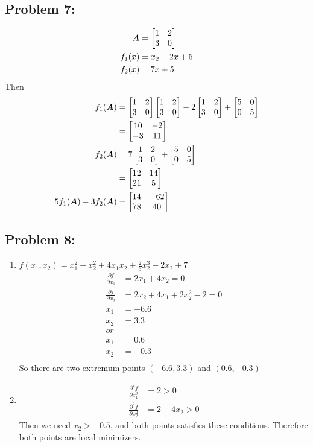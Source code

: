 \documentclass{article}
\begin{document}
\hypertarget{}{}
\subsection*{{Problem 7: }}
\label{}
\begin{align*}
\boldsymbol{A}&=\begin{bmatrix} 1 & 2 \\ 3 & 0 \end{bmatrix} \\
f_1(x) &= x_2 -2x +5  \\
f_2(x) &= 7x +5 \\ 
\end{align*} 
Then \begin{align*} 
f_1(\boldsymbol{A}) & =  \begin{bmatrix} 1 & 2 \\ 3 & 0 \end{bmatrix}\begin{bmatrix} 1 & 2 \\ 3 & 0 \end{bmatrix} - 2\begin{bmatrix} 1 & 2 \\ 3 & 0 \end{bmatrix}+ \begin{bmatrix} 5 & 0 \\ 0 & 5 \end{bmatrix} \\
& = \begin{bmatrix} 10 & -2 \\ -3 & 11 \end{bmatrix} \\ 
f_2(\boldsymbol{A}) & = 7\begin{bmatrix} 1 & 2 \\ 3 & 0 \end{bmatrix} + \begin{bmatrix} 5 & 0 \\ 0 & 5 \end{bmatrix} \\
& = \begin{bmatrix} 12 & 14 \\ 21 & 5 \end{bmatrix} \\
5f_1(\boldsymbol{A})-3f_2(\boldsymbol{A}) & = \begin{bmatrix} 14 & -62 \\ 78 & 40 \end{bmatrix}
\end{align*}

\hypertarget{}{}
\subsection*{{Problem 8: }}
\label{}
\begin{enumerate}
\item
$f(x_1, x_2) = x_1^2 + x_2^2 + 4x_1x_2 +\frac{2}{3}x_2^3-2x_2 + 7$ \\
\begin{align*}
\frac{\partial f}{\partial x_1} &= 2x_1+4x_2 = 0\\
\frac{\partial f}{\partial x_2} &= 2x_2 +4x_1 + 2x_2^2 - 2 = 0 \\
 x_1 &= -6.6 \\ x_2 & = 3.3 \\
 or \\
 x_1 & = 0.6 \\ x_2 & = -0.3 \\
\end{align*}
So there are two extremum points $(-6.6, 3.3) $ and $(0.6, -0.3) $ 
\item 
\begin{align*}
\frac{\partial^2 f}{\partial x_1^2} &= 2 >0 \\
\frac{\partial^2 f}{\partial x_2^2} &= 2+4x_2>0
\end{align*} 
 Then we need $x_2>-0.5$, and both points satisfies these conditions. Therefore both points are local minimizers. 
\end{enumerate}
\end{document}
